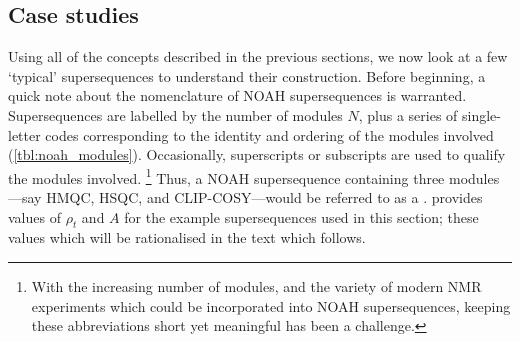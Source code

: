 \subsection{Case studies}
\label{subsec:noah__case_studies}

Using all of the concepts described in the previous sections, we now look at a few `typical' supersequences to understand their construction.
Before beginning, a quick note about the nomenclature of NOAH supersequences is warranted.
Supersequences are labelled by the number of modules $N$, plus a series of single-letter codes corresponding to the identity and ordering of the modules involved (\cref{tbl:noah_modules}).
Occasionally, superscripts or subscripts are used to qualify the modules involved.%
\footnote{With the increasing number of modules, and the variety of modern NMR experiments which could be incorporated into NOAH supersequences, keeping these abbreviations short yet meaningful has been a challenge.}
Thus, a NOAH supersequence containing three modules---say \nitrogen{} HMQC, \carbon{} HSQC, and CLIP-COSY---would be referred to as a .
 provides values of $\rho_t$ and $A$ for the example supersequences used in this section; these values which will be rationalised in the text which follows.

